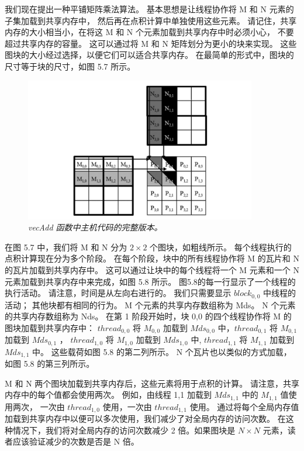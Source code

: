 我们现在提出一种平铺矩阵乘法算法。 基本思想是让线程协作将 M 和 N 元素的子集加载到共享内存中，
然后再在点积计算中单独使用这些元素。 请记住，共享内存的大小相当小，在将这 M 和 N 个元素加载到共享内存中时必须小心，
不要超过共享内存的容量。 这可以通过将 M 和 N 矩阵划分为更小的块来实现。 
这些图块的大小经过选择，以便它们可以适合共享内存。 在最简单的形式中，图块的尺寸等于块的尺寸，如图 5.7 所示。

\begin{figure}[H]
	\centering
	\includegraphics[width=0.9\textwidth]{figs/F5.7.png}
	\caption{\textit{\color{red} vecAdd 函数中主机代码的完整版本。}}
\end{figure}

在图 5.7 中，我们将 M 和 N 分为 $2 \times 2$ 个图块，如粗线所示。 每个线程执行的点积计算现在分为多个阶段。 
在每个阶段，块中的所有线程协作将 M 的瓦片和 N 的瓦片加载到共享内存中。 
这可以通过让块中的每个线程将一个 M 元素和一个 N 元素加载到共享内存中来完成，如图 5.8 所示。 
图5.8的每一行显示了一个线程的执行活动。 请注意，时间是从左向右进行的。 
我们只需要显示 $block_{0,0}$ 中线程的活动； 其他块都有相同的行为。 M 个元素的共享内存数组称为 Mds。 
N 个元素的共享内存数组称为 Nds。 在第 1 阶段开始时，块 0,0 的四个线程协作将 M 的图块加载到共享内存中：
$thread_{0,0}$ 将 $M_{0,0}$ 加载到 $Mds_{0,0}$ 中，$thread_{0,1}$ 将 $M_{0,1}$ 加载到 $Mds_{0,1}$ ，
$thread_{1,0}$ 将 $M_{1,0}$ 加载到 $Mds_{1,0}$ 中, $thread_{1,1}$ 将 $M_{1,1}$ 加载到 $Mds_{1,1}$ 中。 
这些载荷如图 5.8 的第二列所示。 N 个瓦片也以类似的方式加载，如图 5.8 的第三列所示。

M 和 N 两个图块加载到共享内存后，这些元素将用于点积的计算。 请注意，共享内存中的每个值都会使用两次。 
例如，由线程 1,1 加载到 $Mds_{1,1}$ 中的 $M_{1,1}$ 值使用两次，
一次由 $thread_{1,0}$ 使用，一次由 $thread_{1,1}$ 使用。 
通过将每个全局内存值加载到共享内存中以便可以多次使用，我们减少了对全局内存的访问次数。 
在这种情况下，我们将对全局内存的访问次数减少 2 倍。如果图块是 $N \times N$ 元素，读者应该验证减少的次数是否是 N 倍。

